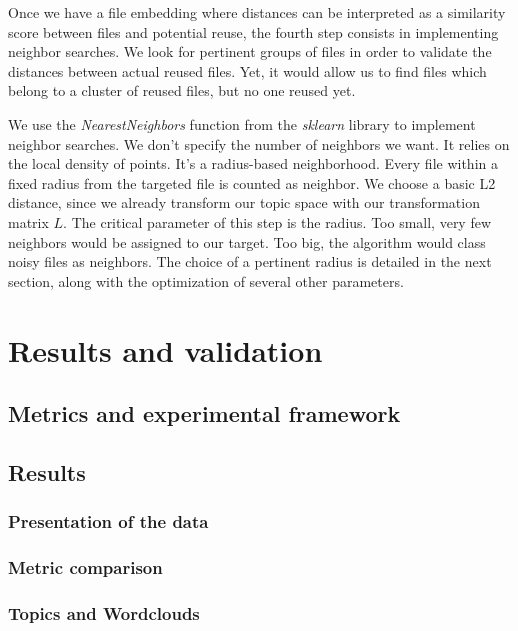 \documentclass[a4paper]{article}
\begin{document}
	Once we have a file embedding where distances can be interpreted as a similarity score between files and potential reuse, the fourth step consists in implementing neighbor searches. We look for pertinent groups of files in order to validate the distances between actual reused files. Yet, it would allow us to find files which belong to a cluster of reused files, but no one reused yet.
	
	We use the \emph{NearestNeighbors} function from the \emph{sklearn} library to implement neighbor searches. We don't specify the number of neighbors we want. It relies on the local density of points. It's a radius-based neighborhood. Every file within a fixed radius from the targeted file is counted as neighbor. We choose a basic L2 distance, since we already transform our topic space with our transformation matrix $L$. The critical parameter of this step is the radius. Too small, very few neighbors would be assigned to our target. Too big, the algorithm would class noisy files as neighbors. The choice of a pertinent radius is detailed in the next section, along with the optimization of several other parameters.
	
	\section{Results and validation}
	
	\subsection{Metrics and experimental framework}
	
	\subsection{Results}
	
	\subsubsection{Presentation of the data}
	
	\subsubsection{Metric comparison}
	
	\subsubsection{Topics and Wordclouds}
	
\end{document}
